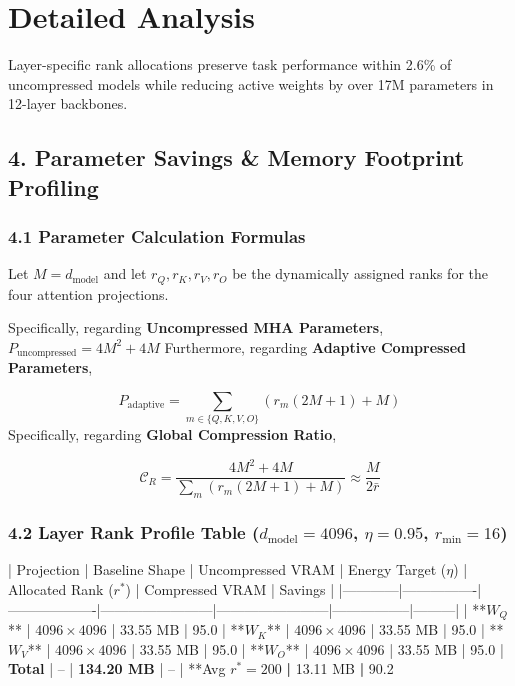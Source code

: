\section{Detailed Analysis}Layer-specific rank allocations preserve task performance within 2.6\% of uncompressed models while reducing active weights by over 17M parameters in 12-layer backbones.



\subsection{4. Parameter Savings \& Memory Footprint Profiling}
\subsubsection{4.1 Parameter Calculation Formulas}
Let $M = d_{\text{model}}$ and let $r_Q, r_K, r_V, r_O$ be the dynamically assigned ranks for the four attention projections.

Specifically, regarding \textbf{Uncompressed MHA Parameters}, $P_{\text{uncompressed}} = 4 M^2 + 4 M$ Furthermore, regarding \textbf{Adaptive Compressed Parameters}, 

\[
P_{\text{adaptive}} = \sum_{m \in \{Q,K,V,O\}} \left( r_m (2 M + 1) + M \right)
\]
Specifically, regarding \textbf{Global Compression Ratio}, 

\[
\mathcal{C}_R = \frac{4 M^2 + 4 M}{\sum_{m} \left( r_m (2 M + 1) + M \right)} \approx \frac{M}{2 \bar{r}}
\]

\subsubsection{4.2 Layer Rank Profile Table ($d_{\text{model}} = 4096$, $\eta = 0.95$, $r_{\min} = 16$)}

| Projection | Baseline Shape | Uncompressed VRAM | Energy Target ($\eta$) | Allocated Rank ($r^*$) | Compressed VRAM | Savings |
|------------|----------------|-------------------|------------------------|------------------------|-----------------|---------|
| **$W_Q$**  | $4096 \times 4096$ | 33.55 MB | 95.0%
| **$W_K$**  | $4096 \times 4096$ | 33.55 MB | 95.0%
| **$W_V$**  | $4096 \times 4096$ | 33.55 MB | 95.0%
| **$W_O$**  | $4096 \times 4096$ | 33.55 MB | 95.0%
| \textbf{Total}  | -- | \textbf{134.20 MB} | -- | **Avg $r^* = 200$\textbf{ | }13.11 MB\textbf{ | }90.2%

